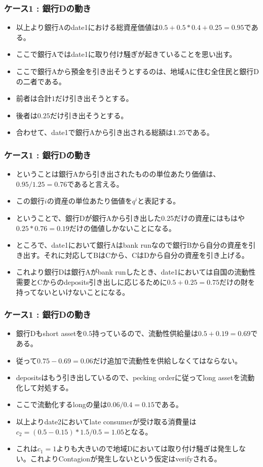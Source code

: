 \documentclass[dvipdfmx, 12pt]{beamer}
\begin{document}
\begin{frame}\frametitle{ケース1 : 銀行Dの動き}
	\begin{itemize}
	\item 以上より銀行Aのdate1における総資産価値は$0.5 + 0.5 * 0.4 + 0.25 = 0.95$である。
	\item ここで銀行Aではdate1に取り付け騒ぎが起きていることを思い出す。
	\item ここで銀行Aから預金を引き出そうとするのは、地域Aに住む全住民と銀行Dの二者である。
	\item 前者は合計$1$だけ引き出そうとする。
	\item 後者は$0.25$だけ引き出そうとする。
	\item 合わせて、date1で銀行Aから引き出される総額は$1.25$である。
	\end{itemize}
\end{frame}

\begin{frame}\frametitle{ケース1 : 銀行Dの動き}
	\begin{itemize}
	\item ということは銀行Aから引き出されたものの単位あたり価値は、$0.95/1.25 = 0.76$であると言える。
	\item この銀行$i$の資産の単位あたり価値を$q^i$と表記する。
	\item ということで、銀行Dが銀行Aから引き出した0.25だけの資産にはもはや$0.25 * 0.76 = 0.19$だけの価値しかないことになる。
	\item ところで、date1において銀行Aはbank runなので銀行Bから自分の資産を引き出す。それに対応してBはCから、CはDから自分の資産を引き上げる。
	\item これより銀行Dは銀行Aがbank runしたとき、date1においては自国の流動性需要とCからのdeposits引き出しに応じるために$0.5 + 0.25 = 0.75$だけの財を持ってないといけないことになる。
	\end{itemize}
\end{frame}

\begin{frame}\frametitle{ケース1 : 銀行Dの動き}
	\begin{itemize}
	\item 銀行Dもshort assetを$0.5$持っているので、流動性供給量は$0.5 + 0.19 = 0.69$である。
	\item 従って$0.75 - 0.69 = 0.06$だけ追加で流動性を供給しなくてはならない。
	\item depositsはもう引き出しているので、pecking orderに従ってlong assetを流動化して対処する。
	\item ここで流動化するlongの量は$0.06/0.4 = 0.15$である。
	\item 以上よりdate2においてlate consumerが受け取る消費量は$c_2 = (0.5 - 0.15)*1.5/0.5 = 1.05$となる。
	\item これは$c_1 = 1$よりも大きいので地域Dにおいては取り付け騒ぎは発生しない。これよりContagionが発生しないという仮定はverifyされる。
	\end{itemize}
\end{frame}
\end{document}

